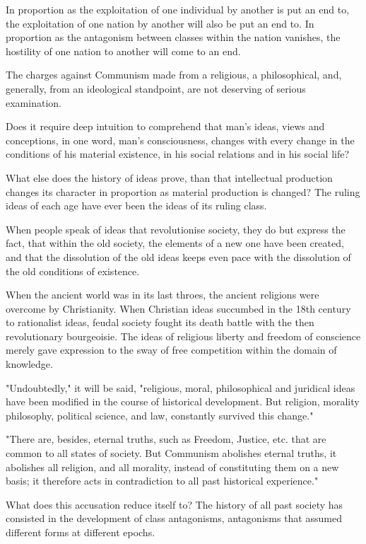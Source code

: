 \documentclass[11pt]{book}
\begin{document}
In proportion as the exploitation of one individual by another
is put an end to, the exploitation of one nation by another will
also be put an end to.  In proportion as the antagonism between
classes within the nation vanishes, the hostility of one nation
to another will come to an end.

The charges against Communism made from a religious, a
philosophical, and, generally, from an ideological standpoint,
are not deserving of serious examination.

Does it require deep intuition to comprehend that man's ideas,
views and conceptions, in one word, man's consciousness, changes
with every change in the conditions of his material existence, in
his social relations and in his social life?

What else does the history of ideas prove, than that
intellectual production changes its character in proportion as
material production is changed? The ruling ideas of each age
have ever been the ideas of its ruling class.

When people speak of ideas that revolutionise society, they do
but express the fact, that within the old society, the elements
of a new one have been created, and that the dissolution of the
old ideas keeps even pace with the dissolution of the old
conditions of existence.

When the ancient world was in its last throes, the ancient
religions were overcome by Christianity.  When Christian ideas
succumbed in the 18th century to rationalist ideas, feudal
society fought its death battle with the then revolutionary
bourgeoisie.  The ideas of religious liberty and freedom of
conscience merely gave expression to the sway of free competition
within the domain of knowledge.

"Undoubtedly," it will be said, "religious, moral, philosophical
and juridical ideas have been modified in the course of
historical development.  But religion, morality philosophy,
political science, and law, constantly survived this change."

"There are, besides, eternal truths, such as Freedom, Justice,
etc. that are common to all states of society. But Communism
abolishes eternal truths, it abolishes all religion, and all
morality, instead of constituting them on a new basis; it
therefore acts in contradiction to all past historical experience."

What does this accusation reduce itself to?  The history of
all past society has consisted in the development of class
antagonisms, antagonisms that assumed different forms at
different epochs.
\end{document}
